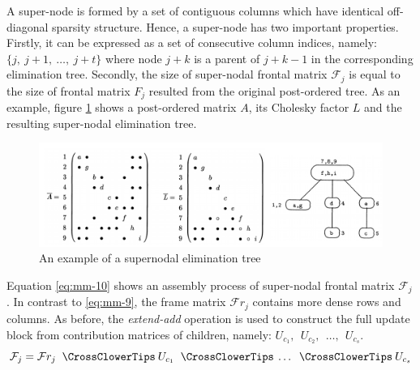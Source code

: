 A super-node is formed by a set of contiguous columns which have identical off-diagonal sparsity structure. Hence, a super-node has two important properties. Firstly, it can be expressed as a set of consecutive column indices, namely: $\{j, \: j+1, \: \dots, \:j + t\}$ where node $j + k$ is a parent of $j + k - 1$ in the corresponding elimination tree. Secondly, the size of super-nodal frontal matrix $\mathcal{F}_{j}$ is equal to the size of frontal matrix $F_{j}$ resulted from the original post-ordered tree. As an example, figure \ref{fig:supernodal-method-postordering-and-etree} shows a post-ordered matrix $A$, its Cholesky factor $L$ and the resulting super-nodal elimination tree.\\


\figpointer{\ref{fig:supernodal-method-postordering-and-etree}}

\begin{figure}[htpb]
  \centering
  \includegraphics[width=1.0\textwidth]{figures/chapter-2/supernodal-method-postordering-and-etree.png}
\caption{An example of a supernodal elimination tree \cite{mult-frontal-original:2}}
\label{fig:supernodal-method-postordering-and-etree}
\end{figure}
 
 
Equation \ref{eq:mm-10} shows an assembly process of super-nodal frontal matrix $\mathcal{F}_{j}$. In contrast to \ref{eq:mm-9}, the frame matrix $\mathcal{F}r_{j}$ contains more dense rows and columns. As before, the \textit{extend-add} operation is used to construct the full update block from contribution matrices of children, namely: $ U_{c_1}, \:\: U_{c_2}, \:\: \dots, \:\: U_{c_s} $.\\


\begin{equation} \label{eq:mm-10-0}
	\mathcal{F}_{j} = \mathcal{F}r_{j} \extendadd U_{c_1} \extendadd \dots \extendadd U_{c_s} 
\end{equation}


